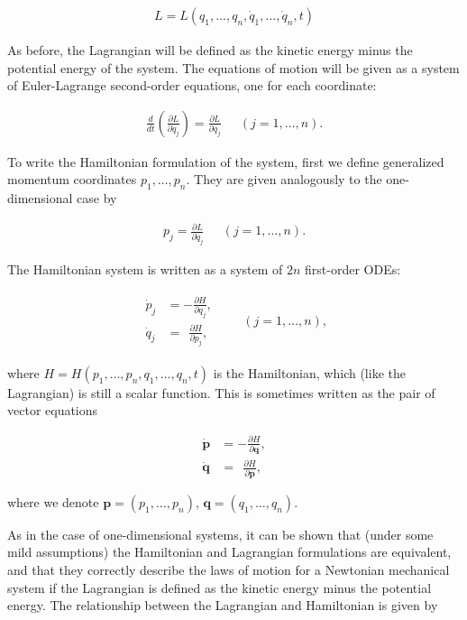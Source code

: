 \documentclass[11pt]{report}
\theoremstyle{plain}
\theoremstyle{definition}
\begin{document}
\begin{align*}
L = L(q_1,\ldots,q_n,\dot{q}_1,\ldots,\dot{q}_n, t)
\end{align*}

\noindent As before, the Lagrangian will be defined as the
kinetic energy minus the potential energy of the
system. The equations of motion will be given as a
system of Euler-Lagrange second-order equations, one
for each coordinate:

\begin{align*}
\frac{d}{dt}\left( \frac{\partial L}{\partial \dot{q}_j} \right) = \frac{\partial L}{\partial q_j} \ \ \quad (j=1,\ldots,n).
\end{align*}

\noindent To write the Hamiltonian formulation of the system,
first we define generalized momentum coordinates
$p_1,\ldots,p_n$. They are given analogously to the
one-dimensional case by

\begin{align*}
p_j = \frac{\partial L}{\partial \dot{q}_j} \ \ \quad (j=1,\ldots,n).
\end{align*}

\noindent The Hamiltonian system is written as a system of $2n$
first-order ODEs:

\begin{align*}
\begin{array}{rl} \displaystyle
\dot{p}_j &= \displaystyle-\frac{\partial H}{\partial q_j}, \\
\displaystyle \dot{q}_j &= \displaystyle \ \ \frac{\partial H}{\partial p_j},
\end{array} \qquad (j=1,\ldots,n),
\end{align*}

\noindent where $H=H(p_1,\ldots,p_n,q_1,\ldots,q_n, t)$ is the
Hamiltonian, which (like the Lagrangian) is still a
scalar function. This is sometimes written as the pair
of vector equations

\begin{align*}
\dot{\mathbf{p}} &= -\frac{\partial H}{\partial \mathbf{q}}, \\
\dot{\mathbf{q}} &= \ \ \frac{\partial H}{\partial \mathbf{p}},
\end{align*}

\noindent where we denote $\mathbf{p}=(p_1,\ldots,p_n)$,
$\mathbf{q}=(q_1,\ldots,q_n)$.

As in the case of one-dimensional systems, it can be
shown that (under some mild assumptions) the
Hamiltonian and Lagrangian formulations are
equivalent, and that they correctly describe the laws
of motion for a Newtonian mechanical system if the
Lagrangian is defined as the kinetic energy minus the
potential energy. The relationship between the
Lagrangian and Hamiltonian is given by
\end{document}
